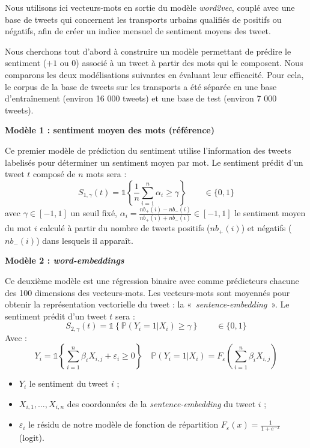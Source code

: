\documentclass[10pt,french,french]{article}
\begin{document}
Nous utilisons ici vecteurs-mots en sortie du modèle \emph{word2vec},
couplé avec une base de tweets qui concernent les transports urbains
qualifiés de positifs ou négatifs, afin de créer un indice mensuel de
sentiment moyens des tweet.

Nous cherchons tout d'abord à construire un modèle permettant de prédire
le sentiment (\(+1\) ou \(0\)) associé à un tweet à partir des mots qui
le composent. Nous comparons les deux modélisations suivantes en
évaluant leur efficacité. Pour cela, le corpus de la base de tweets sur
les transports a été séparée en une base d'entraînement (environ 16 000
tweets) et une base de test (environ 7 000 tweets).

\begin{multicols}{2}

\textbf{Modèle 1 : sentiment moyen des mots (référence)}

Ce premier modèle de prédiction du sentiment utilise l'information des tweets labelisés pour déterminer un sentiment moyen par mot.
Le sentiment prédit d'un tweet $t$ composé de $n$ mots sera :
$$S_{1,\gamma}(t) = \mathds{1}\left\{ \frac{1}{n} \sum \limits_{i=1}^n \alpha_i \geq \gamma\right\} \qquad \in \{ 0,1\}$$
  avec $\gamma \in [-1,1]$ un seuil fixé, $\alpha_i = \frac{nb_+(i) - nb_-(i)}{nb_+(i) + nb_-(i)} \in [-1,1]$  le sentiment moyen du mot $i$ calculé à partir du nombre de tweets positifs ($nb_+(i)$) et négatifs ($nb_-(i)$) dans lesquels il apparaît.

\vspace{2.5cm}

\textbf{Modèle 2 : \emph{word-embeddings}}

Ce deuxième modèle est une régression binaire avec comme prédicteurs chacune des 100 dimensions des vecteurs-mots. Les vecteurs-mots sont moyennés pour obtenir la représentation vectorielle du tweet : la  « \emph{sentence-embedding} ».
Le sentiment prédit d'un tweet $t$ sera :
 $$S_{2,\gamma}(t) =\mathds{1}\left\{   \mathbb{P}(Y_i = 1 | X_{i}) \ge \gamma\right\} \qquad \in \{ 0,1 \}$$
Avec : 
$$Y_i = \mathds{1}\left\{ \sum_{i = 1}^n \beta_i X_{i,j} + \varepsilon_i \geq 0 \right\} 
\quad  \mathbb{P}(Y_i = 1 | X_{i}) = F_{\varepsilon}\left(\sum_{i = 1}^n \beta_i X_{i,j}\right)$$
\begin{itemize}
\item $Y_i$ le sentiment du tweet $i$ ;
\item $X_{i,1}, \dots, X_{i,n}$ des coordonnées de la \emph{sentence-embedding} du tweet $i$ ;
\item $\varepsilon_i$ le résidu de notre modèle de fonction de répartition $F_{\varepsilon}(x) = \frac{1}{1 + e^{-x}}$ (logit).
\end{itemize}

 \end{multicols}
\end{document}
